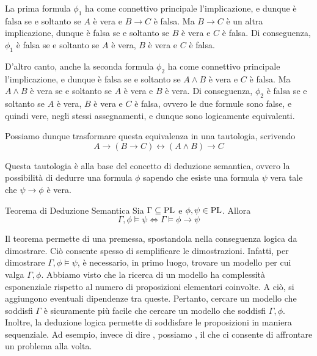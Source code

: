 La prima formula \(\phi_1\) ha come connettivo principale l'implicazione, e dunque è falsa se e soltanto se \(A\) è vera e \(B\to C\) è falsa. Ma \(B\to C\) è un altra implicazione, dunque è falsa se e soltanto se \(B\) è vera e \(C\) è falsa. Di conseguenza, \(\phi_1\) è falsa se e soltanto se \(A\) è vera, \(B\) è vera e \(C\) è falsa.

D'altro canto, anche la seconda formula \(\phi_2\) ha come connettivo principale l'implicazione, e dunque è falsa se e soltanto se \(A\land B\) è vera e \(C\) è falsa. Ma \(A\land B\) è vera se e soltanto se \(A\) è vera e \(B\) è vera. Di conseguenza, \(\phi_2\) è falsa se e soltanto se \(A\) è vera, \(B\) è vera e \(C\) è falsa, ovvero le due formule sono false, e quindi vere, negli stessi assegnamenti, e dunque sono logicamente equivalenti.

Possiamo dunque trasformare questa equivalenza in una tautologia, scrivendo
\[A \to (B\to C) \leftrightarrow (A\land B)\to C\]

Questa tautologia è alla base del concetto di deduzione semantica, ovvero la possibilità di dedurre una formula \(\phi\) sapendo che esiste una formula \(\psi\) vera tale che \(\psi \to \phi\) è vera.

\begin{theorem}[namedlabel={thm:semantic_deduction}{Teorema di Deduzione Semantica}]{Teorema di Deduzione Semantica}
  Sia \(\Gamma \subseteq \operatorname{PL}\) e \(\phi,\psi \in \operatorname{PL}\). Allora
  \[\Gamma,\phi \models \psi \iff \Gamma \models \phi\to\psi\]
\end{theorem}

Il teorema permette di  una premessa, spostandola nella conseguenza logica da dimostrare.
Ciò consente spesso di semplificare le dimostrazioni. 
Infatti, per dimostrare \(\Gamma,\phi \models \psi\), è necessario, in primo luogo, trovare un modello per cui valga \(\Gamma, \phi\).
Abbiamo visto che la ricerca di un modello ha complessità esponenziale rispetto al numero di proposizioni elementari coinvolte. A ciò, si aggiungono eventuali dipendenze tra queste. 
Pertanto, cercare un modello che soddisfi \(\Gamma\) è sicuramente più facile che cercare un modello che soddisfi \(\Gamma, \phi\).
Inoltre, la deduzione logica permette di soddisfare le proposizioni in maniera sequenziale.
Ad esempio, invece di dire , possiamo , il che ci consente di affrontare un problema alla volta.


